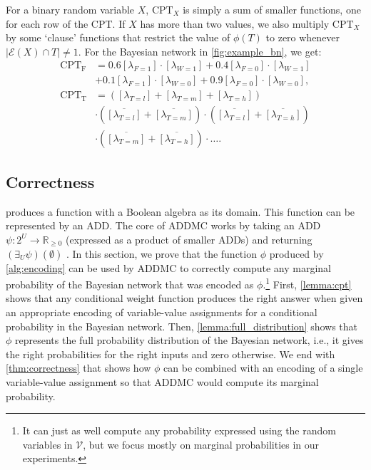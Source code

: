 \documentclass[letterpaper]{article} %
\theoremstyle{definition}
\theoremstyle{remark}
\begin{document}
{For a binary random variable $X$, $\mathrm{CPT}_X$ is simply a sum of smaller
functions, one for each row of the CPT. If $X$ has more than two values, we also
multiply $\mathrm{CPT}_X$ by some `clause' functions that restrict the value of
$\phi(T)$ to zero whenever $|\mathcal{E}(X) \cap T| \ne 1$. For the Bayesian
network in \cref{fig:example_bn}, we get:
\begin{align*}
  \mathrm{CPT_F} &= 0.6[\lambda_{F=1}] \cdot [\lambda_{W=1}] + 0.4[\lambda_{F=0}] \cdot [\lambda_{W=1}] \\
                 &+ 0.1[\lambda_{F=1}] \cdot [\lambda_{W=0}] + 0.9[\lambda_{F=0}] \cdot [\lambda_{W=0}], \\
  \mathrm{CPT_T} &= ([\lambda_{T=l}] + [\lambda_{T=m}] + [\lambda_{T=h}]) \\
                 &\cdot (\overline{[\lambda_{T=l}]} + \overline{[\lambda_{T=m}]}) \cdot (\overline{[\lambda_{T=l}]} + \overline{[\lambda_{T=h}]}) \\
                 &\cdot (\overline{[\lambda_{T=m}]} + \overline{[\lambda_{T=h}]}) \cdot \dots.
\end{align*}

\subsection{Correctness}

 produces a function with a Boolean algebra as its domain.
This function can be represented by an ADD. The core of ADDMC works by taking an
ADD $\psi\colon 2^{U} \to \mathbb{R}_{\ge 0}$ (expressed as a product of smaller
ADDs) and returning $(\exists_U\psi)(\emptyset)$
\cite{DBLP:conf/aaai/DudekPV20}. In this section, we prove that the function
$\phi$ produced by \cref{alg:encoding} can be used by ADDMC to correctly compute
any marginal probability of the Bayesian network that was encoded as
$\phi$.\footnote{It can just as well compute any probability expressed using the
random variables in $\mathcal{V}$, but we focus mostly on marginal probabilities
in our experiments.} First, \cref{lemma:cpt} shows that any conditional weight function
produces the right answer when given an appropriate encoding of
variable-value assignments for a conditional probability in the Bayesian
network. Then, \cref{lemma:full_distribution} shows that $\phi$ represents the
full probability distribution of the Bayesian network, i.e., it gives the right
probabilities for the right inputs and zero otherwise. We end with
\cref{thm:correctness} that shows how $\phi$ can be combined with an encoding of
a single variable-value assignment so that ADDMC would compute its marginal
probability.

}
\end{document}
